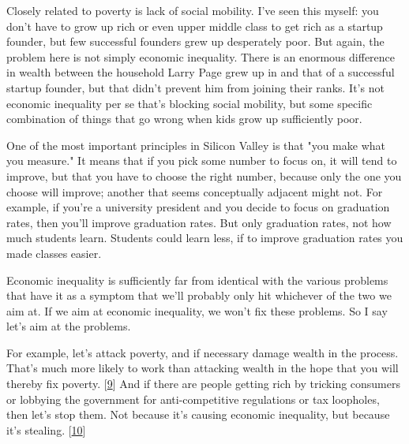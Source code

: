 Closely related to poverty is lack of social
                  mobility. I've seen this myself: you don't have to grow up
                  rich or even upper middle class to get rich as a startup
                  founder, but few successful founders grew up desperately poor.
                  But again, the problem here is not simply economic inequality.
                  There is an enormous difference in wealth between the
                  household Larry Page grew up in and that of a successful
                  startup founder, but that didn't prevent him from joining
                  their ranks. It's not economic inequality per se that's
                  blocking social mobility, but some specific combination of
                  things that go wrong when kids grow up sufficiently poor.

One
                  of the most important principles in Silicon Valley is that
                  "you make what you measure." It means that if you pick some
                  number to focus on, it will tend to improve, but that you have
                  to choose the right number, because only the one you choose
                  will improve; another that seems conceptually adjacent might
                  not. For example, if you're a university president and you
                  decide to focus on graduation rates, then you'll improve
                  graduation rates. But only graduation rates, not how much
                  students learn. Students could learn less, if to improve
                  graduation rates you made classes easier.

Economic
                  inequality is sufficiently far from identical with the various
                  problems that have it as a symptom that we'll probably only
                  hit whichever of the two we aim at. If we aim at economic
                  inequality, we won't fix these problems. So I say let's aim at
                  the problems.

For example, let's attack poverty,
                  and if necessary damage wealth in the process. That's much
                  more likely to work than attacking wealth in the hope that you
                  will thereby fix poverty.
                  [\href{\#f9n}{9}]
                  And if there are people getting rich by tricking consumers or
                  lobbying the government for anti-competitive regulations or
                  tax loopholes, then let's stop them. Not because it's causing
                  economic inequality, but because it's stealing.
                  [\href{\#f10n}{10}]

